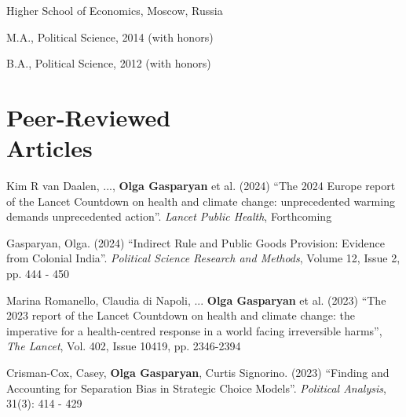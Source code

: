 \documentclass[margin,line,10.95pt]{res}
\newenvironment{list1}{
  \begin{list}{\ding{113}}{%
      \setlength{\itemsep}{0in}
      \setlength{\parsep}{0in} \setlength{\parskip}{0in}
      \setlength{\topsep}{0in} \setlength{\partopsep}{0in}
      \setlength{\leftmargin}{0.17in}}}{\end{list}}
\begin{document}
\begin{resume}
\vspace{-3mm}
{Higher School of Economics, Moscow, Russia}\\
\vspace*{-.1in}
\begin{list1}
 \item[] M.A., Political Science, 2014 (with honors) 
\item[] B.A., Political Science, 2012 (with honors)
\end{list1}



\section{\sc Peer-Reviewed \\ Articles}
Kim R van Daalen, ..., \textbf{Olga Gasparyan} et al.  (2024) ``The 2024 Europe report of the Lancet Countdown on health and climate change: unprecedented warming demands unprecedented action''. \textit{Lancet Public Health}, Forthcoming


\vspace*{-2.5mm}


Gasparyan, Olga. (2024) ``Indirect Rule and Public Goods Provision: Evidence from Colonial India''. \textit{Political Science Research and Methods}, Volume 12, Issue 2, pp. 444 - 450


\vspace*{-2.5mm}

Marina Romanello, Claudia di Napoli, ... \textbf{Olga Gasparyan} et al. (2023) ``The 2023 report of the Lancet Countdown on health and climate change: the imperative for a health-centred response in a world facing irreversible harms'', \textit{The Lancet},  Vol. 402, Issue 10419, pp. 2346-2394  


\vspace*{-2.5mm}

Crisman-Cox, Casey, \textbf{Olga Gasparyan}, Curtis Signorino. (2023) ``Finding and Accounting for Separation Bias in Strategic Choice Models''. \textit{Political Analysis}, 31(3): 414 - 429


\end{resume}
\end{document}
